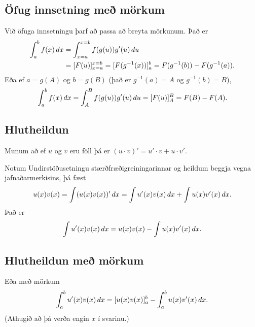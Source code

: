 \documentclass[a4paper,10pt,icelandic]{sphinxmanual}
\begin{document}
\subsection{Öfug innsetning með mörkum}
\label{kafli06:ofug-innsetning-me-morkum}
Við öfuga innsetningu þarf að passa að breyta mörkunum. Það er
\begin{gather}
\begin{split}\begin{aligned}
\int_a^b f(x)\,dx    &= \int_{x=a}^{x=b} f(g(u))g'(u)\,du  \\
&= [F(u)]_{x=a}^{x=b} = [F(g^{-1}(x))]_a^b = F(g^{-1}(b)) - F(g^{-1}(a)).\end{aligned}\end{split}\notag
\end{gather}
Eða ef \(a=g(A)\) og \(b=g(B)\) (það er \(g^{-1}(a) = A\) og
\(g^{-1}(b) = B\)),
\begin{gather}
\begin{split}\int_a^b f(x)\,dx  = \int_A^B f(g(u))g'(u)\,du= [F(u)]_A^B = F(B) - F(A).\end{split}\notag
\end{gather}

\subsection{Hlutheildun}
\label{kafli06:hlutheildun}\label{kafli06:index-11}
Munum að ef \(u\) og \(v\) eru föll þá er
\((u\cdot v)' = u'\cdot v + u \cdot v'\).

Notum Undirstöðusetningu stærðfræðigreiningarinnar og heildum beggja
vegna jafnaðarmerkisins, þá fæst
\begin{gather}
\begin{split}u(x)v(x) = \int (u(x)v(x))'\, dx = \int u'(x)v(x)\, dx + \int u(x)v'(x)\, dx.\end{split}\notag
\end{gather}
Það er
\begin{gather}
\begin{split}\int u'(x)v(x)\, dx = u(x)v(x) -  \int u(x)v'(x)\, dx.\end{split}\notag
\end{gather}

\subsection{Hlutheildun með mörkum}
\label{kafli06:hlutheildun-me-morkum}
Eða með mörkum
\begin{gather}
\begin{split}\int_a^b u'(x)v(x)\, dx = [u(x)v(x)]_a^b -  \int_a^b u(x)v'(x)\, dx.\end{split}\notag
\end{gather}
(Athugið að þá verða engin \(x\) í svarinu.)
\end{document}
